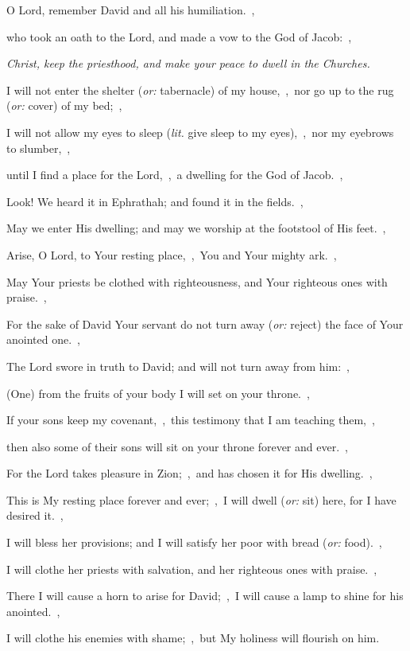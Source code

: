 \documentclass[12pt,twoside,a5paper]{article}
\newcommand{\qanona}[1]{{\liturgicalhint{Qanona.} \emph{#1}}}
\newcommand{\translationoption}[1]{\emph{or:} #1}
\newcommand{\translationliteral}[1]{\emph{lit.} #1}
\begin{document}
\begin{normalparskip}
  O Lord, remember David and all his humiliation.~\sep

  who took an oath to the Lord, and made a vow to the God of Jacob:~\sep

  \qanona{Christ, keep the priesthood, and make your peace to dwell in the Churches.}

  I will not enter the shelter (\translationoption{tabernacle}) of my house,~\sep\ nor go up to the rug (\translationoption{cover}) of my bed;~\sep

  I will not allow my eyes to sleep (\translationliteral{give sleep to my eyes}),~\sep\ nor my eyebrows to slumber,~\sep

  until I find a place for the Lord,~\sep\ a dwelling for the God of Jacob.~\sep

  Look! We heard it in Ephrathah; and found it in the fields.~\sep

  May we enter His dwelling; and may we worship at the footstool of His feet.~\sep

  Arise, O Lord, to Your resting place,~\sep\ You and Your mighty ark.~\sep

  May Your priests be clothed with righteousness, and Your righteous ones with praise.~\sep

  For the sake of David Your servant do not turn away (\translationoption{reject}) the face of Your anointed one.~\sep

  The Lord swore in truth to David; and will not turn away from him:~\sep

  (One) from the fruits of your body I will set on your throne.~\sep

  If your sons keep my covenant,~\sep\ this testimony that I am teaching them,~\sep

  then also some of their sons will sit on your throne forever and ever.~\sep

  For the Lord takes pleasure in Zion;~\sep\ and has chosen it for His dwelling.~\sep

  This is My resting place forever and ever;~\sep\ I will dwell (\translationoption{sit}) here, for I have desired it.~\sep

  I will bless her provisions; and I will satisfy her poor with bread (\translationoption{food}).~\sep

  I will clothe her priests with salvation, and her righteous ones with praise.~\sep

  There I will cause a horn to arise for David;~\sep\ I will cause a lamp to shine for his anointed.~\sep

  I will clothe his enemies with shame;~\sep\ but My holiness will flourish on him.
\end{normalparskip}
\end{document}
